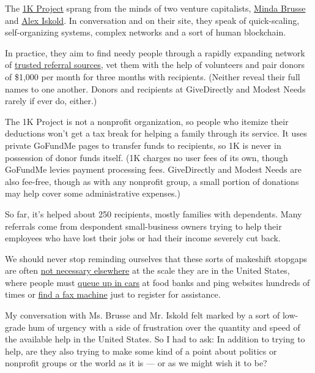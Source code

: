The \href{https://www.1kproject.org/}{1K Project} sprang from the minds
of two venture capitalists,
\href{https://www.firstrowpartners.vc/}{Minda Brusse} and
\href{https://www.2048.vc/}{Alex Iskold}. In conversation and on their
site, they speak of quick-scaling, self-organizing systems, complex
networks and a sort of human blockchain.

In practice, they aim to find needy people through a rapidly expanding
network of \href{https://airtable.com/shrbR4m4Gkbh3vadJ}{trusted
referral sources}, vet them with the help of volunteers and pair donors
of \$1,000 per month for three months with recipients. (Neither reveal
their full names to one another. Donors and recipients at GiveDirectly
and Modest Needs rarely if ever do, either.)

The 1K Project is not a nonprofit organization, so people who itemize
their deductions won't get a tax break for helping a family through its
service. It uses private GoFundMe pages to transfer funds to recipients,
so 1K is never in possession of donor funds itself. (1K charges no user
fees of its own, though GoFundMe levies payment processing fees.
GiveDirectly and Modest Needs are also fee-free, though as with any
nonprofit group, a small portion of donations may help cover some
administrative expenses.)

So far, it's helped about 250 recipients, mostly families with
dependents. Many referrals come from despondent small-business owners
trying to help their employees who have lost their jobs or had their
income severely cut back.

We should never stop reminding ourselves that these sorts of makeshift
stopgaps are often
\href{https://www.nytimes3xbfgragh.onion/2020/03/28/business/nordic-way-economic-rescue-virus.html}{not
necessary elsewhere} at the scale they are in the United States, where
people must
\href{https://www.nytimes3xbfgragh.onion/interactive/2020/05/26/magazine/coronavirus-san-antonio-unemployment-jobs.html}{queue
up in cars} at food banks and ping websites hundreds of times or
\href{https://www.nytimes3xbfgragh.onion/2020/04/04/nyregion/coronavirus-ny-unemployment-benefits.html}{find
a fax machine} just to register for assistance.

My conversation with Ms. Brusse and Mr. Iskold felt marked by a sort of
low-grade hum of urgency with a side of frustration over the quantity
and speed of the available help in the United States. So I had to ask:
In addition to trying to help, are they also trying to make some kind of
a point about politics or nonprofit groups or the world as it is --- or
as we might wish it to be?

